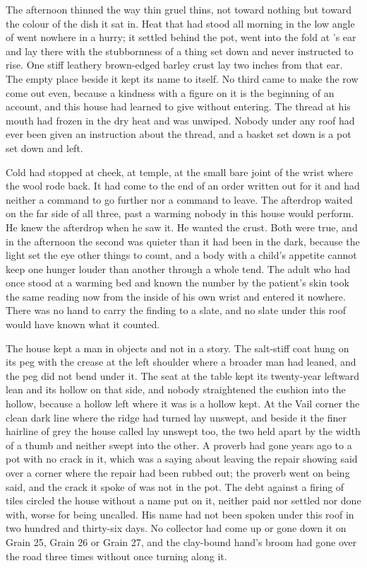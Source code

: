 The afternoon thinned the way thin gruel thins, not toward nothing but toward the colour of the dish it sat in. Heat that had stood all morning in the low angle of  went nowhere in a hurry; it settled behind the pot, went into the fold at 's ear and lay there with the stubbornness of a thing set down and never instructed to rise. One stiff leathery brown-edged barley crust lay two inches from that ear. The empty place beside it kept its name to itself. No third came to make the row come out even, because a kindness with a figure on it is the beginning of an account, and this house had learned to give without entering. The thread at his mouth had frozen in the dry heat and was unwiped. Nobody under any roof had ever been given an instruction about the thread, and a basket set down is a pot set down and left.

Cold had stopped at cheek, at temple, at the small bare joint of the wrist where the wool rode back. It had come to the end of an order written out for it and had neither a command to go further nor a command to leave. The afterdrop waited on the far side of all three, past a warming nobody in this house would perform. He knew the afterdrop when he saw it. He wanted the crust. Both were true, and in the afternoon the second was quieter than it had been in the dark, because the light set the eye other things to count, and a body with a child's appetite cannot keep one hunger louder than another through a whole tend. The adult who had once stood at a warming bed and known the number by the patient's skin took the same reading now from the inside of his own wrist and entered it nowhere. There was no hand to carry the finding to a slate, and no slate under this roof would have known what it counted.

\scenebreak

The house kept a man in objects and not in a story. The salt-stiff coat hung on its peg with the crease at the left shoulder where a broader man had leaned, and the peg did not bend under it. The seat at the table kept its twenty-year leftward lean and its hollow on that side, and nobody straightened the cushion into the hollow, because a hollow left where it was is a hollow kept. At the Vail corner the clean dark line where the ridge had turned lay unswept, and beside it the finer hairline of grey the house called  lay unswept too, the two held apart by the width of a thumb and neither swept into the other. A proverb had gone years ago to a pot with no crack in it, which was a saying about leaving the repair showing said over a corner where the repair had been rubbed out; the proverb went on being said, and the crack it spoke of was not in the pot. The debt against a firing of tiles circled the house without a name put on it, neither paid nor settled nor done with, worse for being uncalled. His name had not been spoken under this roof in two hundred and thirty-six days. No collector had come up  or gone down it on Grain 25, Grain 26 or Grain 27, and the clay-bound hand's broom had gone over the road three times without once turning along it.

